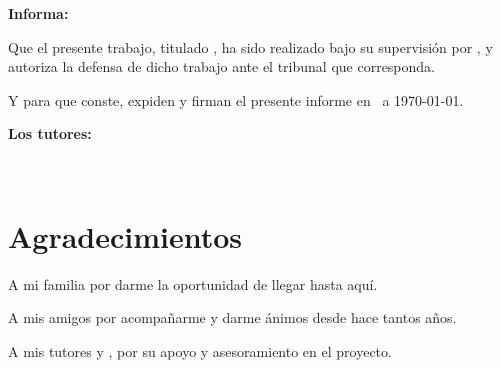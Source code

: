 \textbf{Informa:}

\vspace{0.5cm}

Que el presente trabajo, titulado \textit{\textbf{\titulo}}, ha sido realizado bajo su supervisión por \textbf{\autor}, y 
autoriza la defensa de dicho trabajo ante el tribunal que corresponda.

\vspace{0.5cm}

Y para que conste, expiden y firman el presente informe en \ciudad\ a \today.

\vspace{1cm}

\textbf{Los tutores:}

\vspace{0.5cm}
\vspace{3cm}

\noindent \textbf{\tutor}\\[0.5cm]
\noindent \textbf{\cotutor}

\chapter*{Agradecimientos}
\thispagestyle{empty}

\vspace{1cm}

\bigskip
A mi familia por darme la oportunidad de llegar hasta aquí.

\bigskip
A mis amigos por acompañarme y darme ánimos desde hace tantos años.

\bigskip
A mis tutores {\tutor} y {\cotutor}, por su apoyo y asesoramiento en el proyecto.
